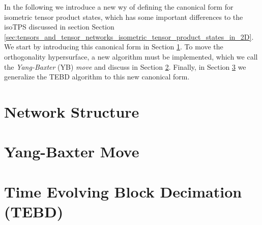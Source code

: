 In the following we introduce a new wy of defining the canonical form for isometric tensor product states, which has some important differences to the isoTPS discussed in section Section \ref{sec:tensors_and_tensor_networks_isometric_tensor_product_states_in_2D}. We start by introducing this canonical form in Section \ref{sec:YB_isoTPS_network_structure}. To move the orthogonality hypersurface, a new algorithm must be implemented, which we call the \textit{Yang-Baxter} (YB) \textit{move} and discuss in Section \ref{sec:YB_isoTPS_yang_baxter_move}. Finally, in Section \ref{sec:YB_isoTPS_TEBD} we generalize the TEBD algorithm to this new canonical form.

\section{Network Structure}
\label{sec:YB_isoTPS_network_structure}


\section{Yang-Baxter Move}
\label{sec:YB_isoTPS_yang_baxter_move}


\section{Time Evolving Block Decimation (TEBD)}
\label{sec:YB_isoTPS_TEBD}
